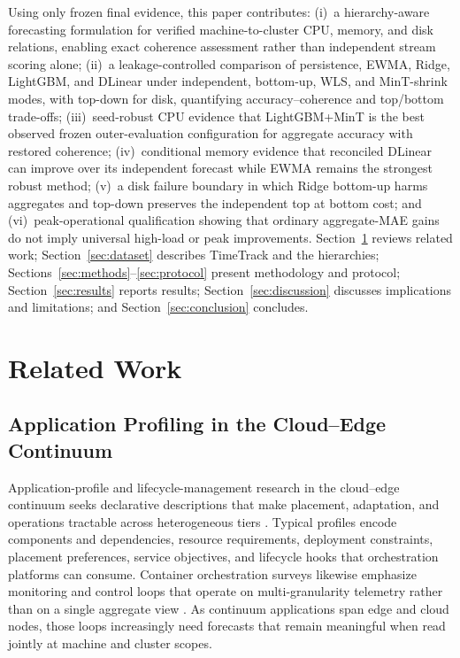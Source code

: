 \documentclass[a4paper,fleqn]{cas-dc}
\begin{document}
Using only frozen final evidence, this paper contributes:
(i)~a hierarchy-aware forecasting formulation for verified machine-to-cluster
{CPU}, memory, and disk relations, enabling exact coherence assessment rather
than independent stream scoring alone;
(ii)~a leakage-controlled comparison of persistence, {EWMA}, Ridge, LightGBM,
and DLinear under independent, bottom-up, {WLS}, and MinT-shrink modes, with
top-down for disk, quantifying accuracy--coherence and top/bottom trade-offs;
(iii)~seed-robust {CPU} evidence that LightGBM+MinT is the best observed frozen
outer-evaluation configuration for aggregate accuracy with restored coherence;
(iv)~conditional memory evidence that reconciled DLinear can improve over its
independent forecast while {EWMA} remains the strongest robust method;
(v)~a disk failure boundary in which Ridge bottom-up harms aggregates and
top-down preserves the independent top at bottom cost; and
(vi)~peak-operational qualification showing that ordinary aggregate-{MAE} gains
do not imply universal high-load or peak improvements.
Section~\ref{sec:related} reviews related work;
Section~\ref{sec:dataset} describes TimeTrack and the hierarchies;
Sections~\ref{sec:methods}--\ref{sec:protocol} present methodology and protocol;
Section~\ref{sec:results} reports results;
Section~\ref{sec:discussion} discusses implications and limitations; and
Section~\ref{sec:conclusion} concludes.

\section{Related Work}
\label{sec:related}

\subsection{Application Profiling in the Cloud--Edge Continuum}
Application-profile and lifecycle-management research in the cloud--edge
continuum seeks declarative descriptions that make placement, adaptation, and
operations tractable across heterogeneous tiers
\cite{duc2020survey,taherizadeh2018monitoring,buyya2019manifesto}.
Typical profiles encode components and dependencies, resource requirements,
deployment constraints, placement preferences, service objectives, and lifecycle
hooks that orchestration platforms can consume.
Container orchestration surveys likewise emphasize monitoring and control loops
that operate on multi-granularity telemetry rather than on a single aggregate
view
\cite{casalicchio2019container,rossi2020geo,toka2021kubernetes}.
As continuum applications span edge and cloud nodes, those loops increasingly
need forecasts that remain meaningful when read jointly at machine and cluster
scopes.
\end{document}
